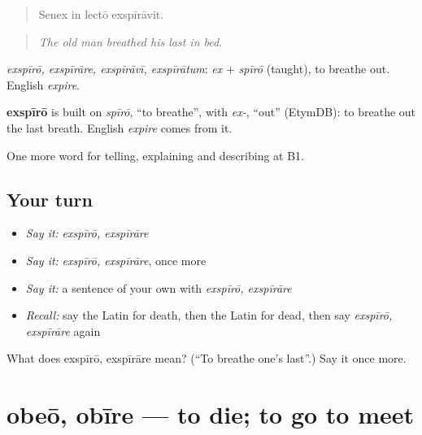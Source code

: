 \begin{quote}
Senex in lectō exspīrāvit.
\end{quote}

\begin{quote}
\emph{The old man breathed his last in bed.}
\end{quote}

\emph{exspīrō, exspīrāre, exspīrāvī, exspīrātum}: \emph{ex} + \emph{spīrō} (taught), to breathe out. English \emph{expire}.

\begin{cousinweb}
\textbf{exspīrō} is built on \emph{spīrō}, \textquotedblleft{}to breathe\textquotedblright{}, with \emph{ex-}, \textquotedblleft{}out\textquotedblright{} (EtymDB): to breathe out the last breath. English \emph{expire} comes from it.
\end{cousinweb}

\begin{grammarlens}[title={What you've built}]
One more word for telling, explaining and describing at B1.
\end{grammarlens}

\subsection*{Your turn}
\begin{itemize}
\raggedright
  \item \emph{Say it:} \emph{exspīrō, exspīrāre}
  \item \emph{Say it:} \emph{exspīrō, exspīrāre}, once more
  \item \emph{Say it:} a sentence of your own with \emph{exspīrō, exspīrāre}
  \item \emph{Recall:} say the Latin for death, then the Latin for dead, then say \emph{exspīrō, exspīrāre} again
\end{itemize}

\begin{tcolorbox}[breakable,colback=teal!4,colframe=teal!35!black,title={Before you move on}]
What does exspīrō, exspīrāre mean? (\textquotedblleft{}To breathe one's last\textquotedblright{}.) Say it once more.
\end{tcolorbox}
\section[obeō, obīre]{obeō, obīre — to die; to go to meet}

\label{lesson:LA-C329-obeo}



